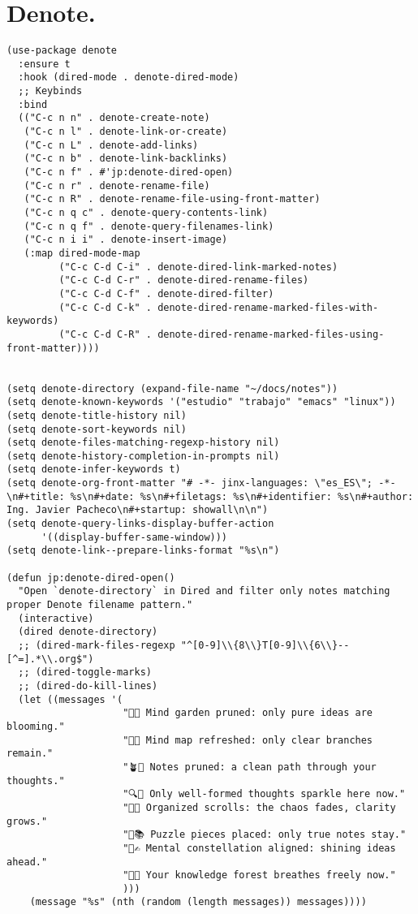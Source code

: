 \documentclass[11pt]{article}
\begin{document}
\section{Denote.}
\label{sec:orgc81b6a5}
\begin{verbatim}
(use-package denote
  :ensure t
  :hook (dired-mode . denote-dired-mode)
  ;; Keybinds
  :bind
  (("C-c n n" . denote-create-note)
   ("C-c n l" . denote-link-or-create)
   ("C-c n L" . denote-add-links)
   ("C-c n b" . denote-link-backlinks)
   ("C-c n f" . #'jp:denote-dired-open)
   ("C-c n r" . denote-rename-file)
   ("C-c n R" . denote-rename-file-using-front-matter)
   ("C-c n q c" . denote-query-contents-link)
   ("C-c n q f" . denote-query-filenames-link)
   ("C-c n i i" . denote-insert-image)
   (:map dired-mode-map
         ("C-c C-d C-i" . denote-dired-link-marked-notes)
         ("C-c C-d C-r" . denote-dired-rename-files)
         ("C-c C-d C-f" . denote-dired-filter)
         ("C-c C-d C-k" . denote-dired-rename-marked-files-with-keywords)
         ("C-c C-d C-R" . denote-dired-rename-marked-files-using-front-matter))))


(setq denote-directory (expand-file-name "~/docs/notes"))
(setq denote-known-keywords '("estudio" "trabajo" "emacs" "linux"))
(setq denote-title-history nil)
(setq denote-sort-keywords nil)
(setq denote-files-matching-regexp-history nil)
(setq denote-history-completion-in-prompts nil)
(setq denote-infer-keywords t)
(setq denote-org-front-matter "# -*- jinx-languages: \"es_ES\"; -*-\n#+title: %s\n#+date: %s\n#+filetags: %s\n#+identifier: %s\n#+author: Ing. Javier Pacheco\n#+startup: showall\n\n")
(setq denote-query-links-display-buffer-action
      '((display-buffer-same-window)))
(setq denote-link--prepare-links-format "%s\n")

(defun jp:denote-dired-open()
  "Open `denote-directory` in Dired and filter only notes matching proper Denote filename pattern."
  (interactive)
  (dired denote-directory)
  ;; (dired-mark-files-regexp "^[0-9]\\{8\\}T[0-9]\\{6\\}--[^=].*\\.org$")
  ;; (dired-toggle-marks)
  ;; (dired-do-kill-lines)
  (let ((messages '(
                    "🧠🌿 Mind garden pruned: only pure ideas are blooming."
                    "🧠✨ Mind map refreshed: only clear branches remain."
                    "🪴📝 Notes pruned: a clean path through your thoughts."
                    "🔍🌟 Only well-formed thoughts sparkle here now."
                    "📜🌱 Organized scrolls: the chaos fades, clarity grows."
                    "🧩📚 Puzzle pieces placed: only true notes stay."
                    "🌌✍️ Mental constellation aligned: shining ideas ahead."
                    "🌿📖 Your knowledge forest breathes freely now."
                    )))
    (message "%s" (nth (random (length messages)) messages))))


\end{verbatim}
\end{document}
